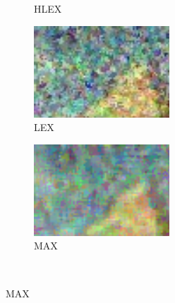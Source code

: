 \begin{figure}
{\begin{subfigure}[b]{0.25\textwidth}
			\caption{HLEX}
			\label{fig:hlex}
		\end{subfigure}
		\begin{subfigure}[b]{0.25\textwidth}
			\centering
			\includegraphics[width=0.95\linewidth]{fig/LEX}
			\caption{LEX}
			\label{fig:lex}
		\end{subfigure}
		\begin{subfigure}[b]{0.25\textwidth}
			\centering
			\includegraphics[width=0.95\linewidth]{fig/MAXM5}
			\caption{MAX}
			\label{fig:max}
		\end{subfigure}
	}\\
\end{figure}
